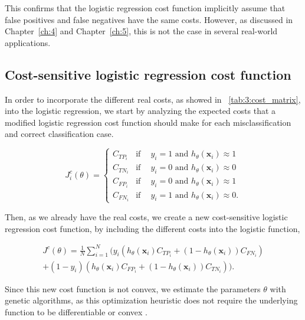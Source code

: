 This confirms that the logistic regression cost function implicitly assume that 
false positives and false negatives have the same costs. However, as discussed in 
Chapter~\ref{ch:4} and Chapter~\ref{ch:5}, this is not the case in several real-world 
applications.

  
\subsection{Cost-sensitive logistic regression cost function}
\label{sec:7:cscostfunction}

In order to incorporate the different real costs, as showed in 
\tablename{~\ref{tab:3:cost_matrix}}, into the logistic regression, we start by analyzing the 
expected costs that a modified logistic regression cost function should make for each 
misclassification and correct classification case.

\begin{equation*}
  J^c_i(\theta) = 
  \begin{cases}
    C_{TP_i}    & \text{if} \phantom{-}  y_i = 1 \text{ and } h_\theta(\mathbf{x}_i) \approx 1  \\
    C_{TN_i}    & \text{if} \phantom{-}  y_i = 0 \text{ and } h_\theta(\mathbf{x}_i) \approx 0  \\
    C_{FP_i}    & \text{if} \phantom{-}  y_i = 0 \text{ and } h_\theta(\mathbf{x}_i) \approx 1  \\
    C_{FN_i}    & \text{if} \phantom{-}  y_i = 1 \text{ and } h_\theta(\mathbf{x}_i) \approx 0 .
  \end{cases}
\end{equation*}

Then, as we already have the real costs, we create a new cost-sensitive logistic regression cost 
function, by including the different costs into the logistic function,

\begin{align}\label{eq:CSLR}
  J^c(\theta)=\frac{1}{N} \sum_{i=1}^{N} \bigg( y_i(h_\theta(\mathbf{x}_i) C_{TP_i} + 
  (1-h_\theta(\mathbf{x}_i))C_{FN_i})  \nonumber\\ 
  +(1-y_i)(h_\theta(\mathbf{x}_i) C_{FP_i} + (1-h_\theta(\mathbf{x}_i))C_{TN_i}) \bigg).
\end{align}

Since this  new cost function is not convex, we estimate the parameters $\theta$ with genetic 
algorithms, as this optimization heuristic does not require the underlying function to be 
differentiable or convex \citep{Haupt2004}. 


